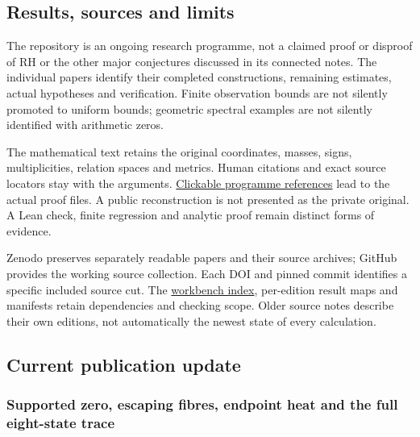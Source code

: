 \documentclass[
]{article}
\begin{document}
\subsection{Results, sources and
limits}\label{results-sources-and-limits}

The repository is an ongoing research programme, not a claimed proof or
disproof of RH or the other major conjectures discussed in its connected
notes. The individual papers identify their completed constructions,
remaining estimates, actual hypotheses and verification. Finite
observation bounds are not silently promoted to uniform bounds;
geometric spectral examples are not silently identified with arithmetic
zeros.

The mathematical text retains the original coordinates, masses, signs,
multiplicities, relation spaces and metrics. Human citations and exact
source locators stay with the arguments.
\href{https://github.com/KokunoYumeto/zeta-function-research-reader/blob/666ee448d5ecb0bf8a4888f3a2aceaaa5c74d6d8/workbenches/splitzero-tandem/continuations/20260921-historical-proof-citations/REFERENCES.md}{Clickable
programme references} lead to the actual proof files. A public
reconstruction is not presented as the private original. A Lean check,
finite regression and analytic proof remain distinct forms of evidence.

Zenodo preserves separately readable papers and their source archives;
GitHub provides the working source collection. Each DOI and pinned
commit identifies a specific included source cut. The
\href{https://github.com/KokunoYumeto/zeta-function-research-reader/blob/main/WORKBENCHES.json}{workbench
index}, per-edition result maps and manifests retain dependencies and
checking scope. Older source notes describe their own editions, not
automatically the newest state of every calculation.

\subsection{Current publication
update}\label{current-publication-update}

\subsubsection{Supported zero, escaping fibres, endpoint heat and the
full eight-state
trace}\label{supported-zero-escaping-fibres-endpoint-heat-and-the-full-eight-state-trace}
\end{document}
